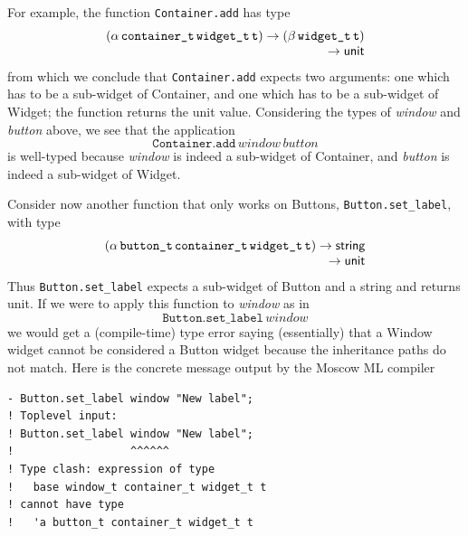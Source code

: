 \documentclass[workingdraft,endnotes]{usetex-v1}
\begin{document}
For example, the function \texttt{Container.add} has type
\begin{displaymath}\begin{array}{l}
(\tApp{\tApp{\tApp{\alpha}{\tWitness{container}}}{\tWitness{widget}}}{\tName{t}})
\rightarrow
(\tApp{\tApp{\beta}{\tWitness{widget}}}{\tName{t}})
\\
\multicolumn{1}{r}{\rightarrow{\tUnit}}
\end{array}\end{displaymath}
from which we conclude that \texttt{Container.add} expects two arguments:
one which has to be a sub-widget of Container, and one which has to be
a sub-widget of Widget; the function returns the unit value. Considering
the types of \textit{window} and \textit{button} above, we see that
the application
\begin{displaymath}
\texttt{Container.add}\,\textit{window}\,\textit{button}
\end{displaymath}
is well-typed because \textit{window} is indeed a sub-widget of 
Container, and \textit{button} is indeed a sub-widget of Widget.

Consider now another function that only works on Buttons, \texttt{Button.set\_label}, with type
\begin{displaymath}\begin{array}{l}
(\tApp{\tApp{\tApp{\tApp{\alpha}{\tWitness{button}}}{\tWitness{container}}}{\tWitness{widget}}}{\tName{t}})
\rightarrow
\tString
\\
\multicolumn{1}{r}{\rightarrow\tUnit}
\end{array}\end{displaymath}
Thus \texttt{Button.set\_label} expects a sub-widget of Button and a string and returns unit.
If we were to apply this function to \textit{window} as in
\begin{displaymath}
\texttt{Button.set\_label}\,\textit{window}
\end{displaymath}
we would get a (compile-time) type error saying (essentially) that
a Window widget cannot be considered a Button widget because the
inheritance paths do not match. Here is the concrete message output
by the Moscow ML compiler
\begin{verbatim}
- Button.set_label window "New label";
! Toplevel input:
! Button.set_label window "New label";
!                  ^^^^^^
! Type clash: expression of type
!   base window_t container_t widget_t t
! cannot have type
!   'a button_t container_t widget_t t
\end{verbatim}
\end{document}
